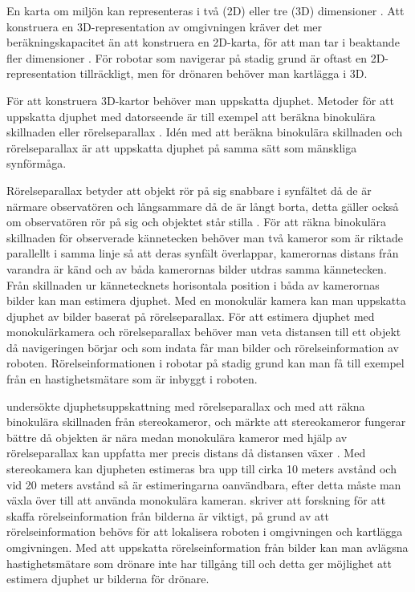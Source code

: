 En karta om miljön kan representeras i två (2D) eller tre (3D) dimensioner \citep{geospatial}. Att konstruera en 3D-representation av omgivningen kräver det mer beräkningskapacitet än att konstruera en 2D-karta, för att man tar i beaktande fler dimensioner \citep{ProbabilisticRobotics}. För robotar som navigerar på stadig grund är oftast en 2D-representation tillräckligt, men för drönaren behöver man kartlägga i 3D. 

För att konstruera 3D-kartor behöver man uppskatta djuphet. Metoder för att uppskatta djuphet med datorseende är till exempel att beräkna binokulära skillnaden eller rörelseparallax \citep{suomimainittu}. Idén med att beräkna binokulära skillnaden och rörelseparallax är att uppskatta djuphet på samma sätt som mänskliga synförmåga.

Rörelseparallax betyder att objekt rör på sig snabbare i synfältet då de är närmare observatören och långsammare då de är långt borta, detta gäller också om observatören rör på sig och objektet står stilla \citep{suomimainittu, parallax}. För att räkna binokulära skillnaden för observerade kännetecken behöver man två kameror som är riktade parallellt i samma linje så att deras synfält överlappar, kamerornas distans från varandra är känd och av båda kamerornas bilder utdras samma kännetecken. Från skillnaden ur kännetecknets horisontala position i båda av kamerornas bilder kan man estimera djuphet. Med en monokulär kamera kan man uppskatta djuphet av bilder baserat på rörelseparallax. För att estimera djuphet med monokulärkamera och rörelseparallax behöver man veta distansen till ett objekt då navigeringen börjar och som indata får man bilder och rörelseinformation av roboten. Rörelseinformationen i robotar på stadig grund kan man få till exempel från en hastighetsmätare som är inbyggt i roboten.

\cite{suomimainittu} undersökte djuphetsuppskattning med rörelseparallax och med att räkna binokulära skillnaden från stereokameror, och märkte att stereokameror fungerar bättre då objekten är nära medan monokulära kameror med hjälp av rörelseparallax kan uppfatta mer precis distans då distansen växer \citep{suomimainittu}. Med stereokamera kan djupheten estimeras bra upp till cirka 10 meters avstånd och vid 20 meters avstånd så är estimeringarna oanvändbara, efter detta måste man växla över till att använda monokulära kameran. \cite{suomimainittu} skriver att forskning för att skaffa rörelseinformation från bilderna är viktigt, på grund av att rörelseinformation behövs för att lokalisera roboten i omgivningen och kartlägga omgivningen. Med att uppskatta rörelseinformation från bilder kan man avlägsna hastighetsmätare som drönare inte har tillgång till och detta ger möjlighet att estimera djuphet ur bilderna för drönare.

